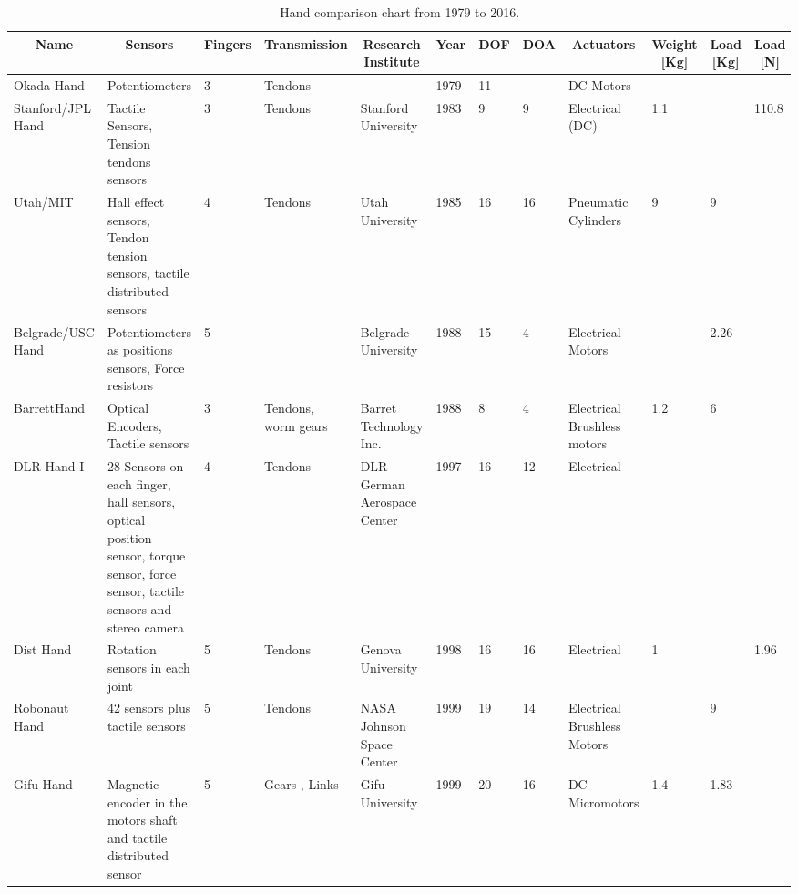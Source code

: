\documentclass[a4paper, 10pt, conference]{ieeeconf}      %
\begin{document}
\begin{landscape}
\begin{table}[]
\centering
\caption{Hand comparison chart from 1979 to 2016.}
\label{hand-comparison}
\begin{tabular}{p{2cm}p{4cm}lp{2cm}p{2cm}lllp{2cm}lll}
\hline
\multicolumn{1}{c}{\textbf{Name}} & \multicolumn{1}{c}{\textbf{Sensors}} & \multicolumn{1}{c}{\textbf{Fingers}} & \multicolumn{1}{c}{\textbf{Transmission}} & \multicolumn{1}{c}{\textbf{Research Institute}} & \multicolumn{1}{c}{\textbf{Year}} & \multicolumn{1}{c}{\textbf{DOF}} & \multicolumn{1}{c}{\textbf{DOA}} & \multicolumn{1}{c}{\textbf{Actuators}} & \multicolumn{1}{c}{\textbf{Weight {[}Kg{]}}} & \multicolumn{1}{c}{\textbf{Load {[}Kg{]}}} & \multicolumn{1}{c}{\textbf{Load {[}N{]}}} \\ \hline
Okada Hand & Potentiometers & 3 & Tendons & & 1979 & 11 & & DC Motors & & & \\ \hline
Stanford/JPL Hand & Tactile Sensors, Tension tendons sensors & 3 & Tendons & Stanford University & 1983 & 9 & 9 & Electrical (DC) & 1.1 &  & 110.8 \\ \hline
Utah/MIT & Hall effect sensors, Tendon tension sensors, tactile distributed sensors & 4 & Tendons & Utah University & 1985 & 16 & 16 & Pneumatic Cylinders & 9 & 9 &  \\ \hline
Belgrade/USC Hand & Potentiometers as positions sensors, Force resistors & 5 &  & Belgrade University & 1988 & 15 & 4 & Electrical Motors &  & 2.26 &  \\ \hline
BarrettHand & Optical Encoders, Tactile sensors & 3 & Tendons, worm gears & Barret Technology Inc. & 1988 & 8 & 4 & Electrical Brushless motors & 1.2 & 6 &  \\ \hline
DLR Hand I & 28 Sensors on each finger, hall sensors, optical position sensor, torque sensor, force sensor, tactile sensors and stereo camera & 4 & Tendons & DLR-German Aerospace Center & 1997 & 16 & 12 & Electrical &  &  &  \\ \hline
Dist Hand & Rotation sensors in each joint & 5 & Tendons & Genova University & 1998 & 16 & 16 & Electrical & 1 &  & 1.96 \\ \hline
Robonaut Hand & 42 sensors plus tactile sensors & 5 & Tendons & NASA Johnson Space Center & 1999 & 19 & 14 & Electrical Brushless Motors &  & 9 &  \\ \hline
Gifu Hand & Magnetic encoder in the motors shaft and tactile distributed sensor & 5 & Gears , Links & Gifu University & 1999 & 20 & 16 & DC Micromotors & 1.4 & 1.83 &  \\ \hline

\end{tabular}
\end{table}
\end{landscape}
\end{document}
